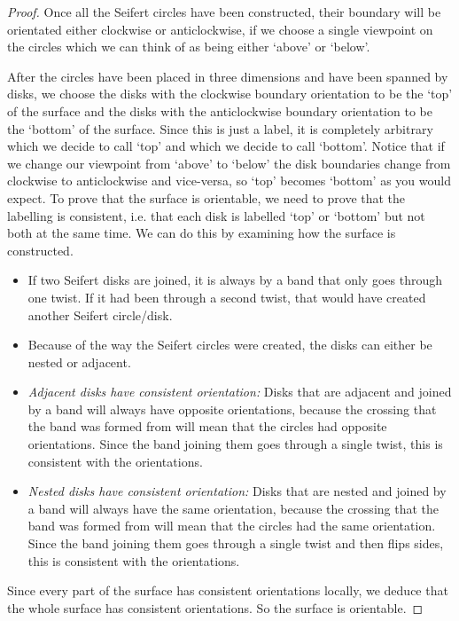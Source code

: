 \documentclass[10pt,a4paper]{report}
\theoremstyle{definition}
\theoremstyle{remark}
\theoremstyle{example}
\begin{document}
\begin{proof}Once all the Seifert circles have been constructed, their boundary will be orientated either clockwise or anticlockwise, if we choose a single viewpoint on the circles which we can think of as being either `above' or `below'.


 After the circles have been placed in three dimensions and have been spanned by disks, we choose the disks with the clockwise boundary orientation to be the `top' of the surface and the disks with the anticlockwise boundary orientation to be the `bottom' of the surface. Since this is just a label, it is completely arbitrary which we decide to call `top' and which we decide to call `bottom'. Notice that if we change our viewpoint from `above' to `below' the disk boundaries change from clockwise to anticlockwise and vice-versa, so `top' becomes `bottom' as you would expect.
  To prove that the surface is orientable, we need to prove that the labelling is consistent, i.e. that each disk is labelled `top' or `bottom' but not both at the same time. We can do this by examining how the surface is constructed. 
  \begin{itemize}
  
  \item If two Seifert disks are joined, it is always by a band that only goes through one twist. If it had been through a second twist, that would have created another Seifert circle/disk.
  
  \item Because of the way the Seifert circles were created, the disks can either be nested or adjacent.
  
  \item \emph{Adjacent disks have consistent orientation:} Disks that are adjacent and joined by a band will always have opposite orientations, because the crossing that the band was formed from will mean that the circles had opposite orientations. Since the band joining them goes through a single twist, this is consistent with the orientations.
  
  \item \emph{Nested disks have consistent orientation:} Disks that are nested and joined by a band will always have the same orientation, because the crossing that the band was formed from will mean that the circles had the same orientation. Since the band joining them goes through a single twist and then flips sides, this is consistent with the orientations.
  \end{itemize}
  
  Since every part of the surface has consistent orientations locally, we deduce that the whole surface has consistent orientations. So the surface is orientable. 
  \end{proof}
  
\end{document}
